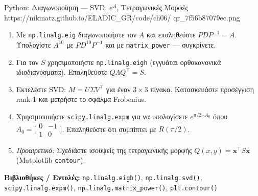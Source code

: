 \begin{pybox}{Python: Διαγωνοποίηση — SVD, $e^A$, Τετραγωνικές Μορφές}%
             {https://nikmatz.github.io/ELADIC_GR/code/ch06/}%
             {qr_7f56b87079ec.png}
\label{py:ch6_diagonalization}
\begin{enumerate}[label=(\alph*),itemsep=2pt]
  \item Με \texttt{np.linalg.eig} διαγωνοποιήστε τον $A$ και
    επαληθεύστε $PDP^{-1}=A$. Υπολογίστε $A^{10}$ με $PD^{10}P^{-1}$
    και με \texttt{matrix\_power} — συγκρίνετε.
  \item Για τον $S$ χρησιμοποιήστε \texttt{np.linalg.eigh}
    (εγγυάται ορθοκανονικά ιδιοδιανύσματα). Επαληθεύστε $Q\Lambda Q^\top=S$.
  \item Εκτελέστε SVD: $M=U\Sigma V^\top$ για έναν $3\times 3$ πίνακα.
    Κατασκευάστε προσέγγιση rank-1 και μετρήστε το σφάλμα Frobenius.
  \item Χρησιμοποιήστε \texttt{scipy.linalg.expm} για να υπολογίσετε
    $e^{\pi/2 \cdot A_0}$ όπου $A_0=\bigl[\begin{smallmatrix}0&-1\\1&0\end{smallmatrix}\bigr]$.
    Επαληθεύστε ότι συμπίπτει με $R(\pi/2)$.
  \item \textit{Προαιρετικό:} Σχεδιάστε ισοϋψείς της τετραγωνικής μορφής
    $Q(x,y)=\mathbf{x}^\top S\mathbf{x}$ (Matplotlib \texttt{contour}).
\end{enumerate}
\medskip
\textbf{Βιβλιοθήκες / Εντολές:}
\texttt{np.linalg.eigh()}, \texttt{np.linalg.svd()},
\texttt{scipy.linalg.expm()},
\texttt{np.linalg.matrix\_power()}, \texttt{plt.contour()}
\end{pybox}
